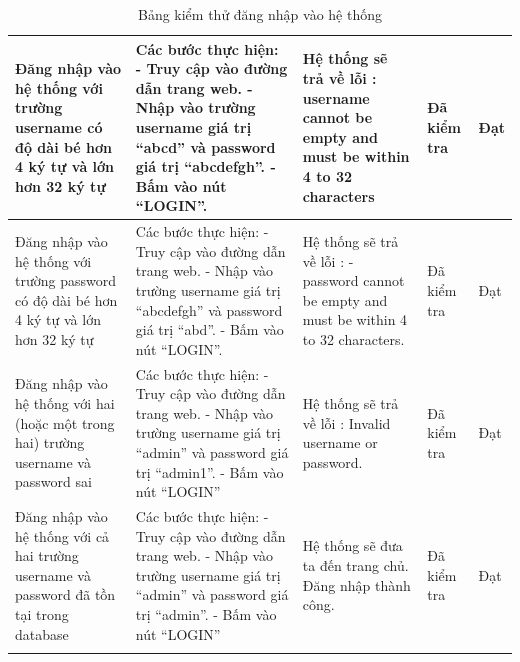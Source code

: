 \documentclass[a4paper]{article}
\begin{document}
\begin{longtable}{ | p{} |p{} | p{}  | p{}  | p{}  | }
\hline
Đăng nhập vào hệ thống với trường username có độ dài bé hơn 4 ký tự và lớn hơn 32 ký tự &
Các bước thực hiện: \newline
- Truy cập vào đường dẫn trang web.  \newline
- Nhập vào trường username giá trị “abcd” và password giá trị “abcdefgh”.  \newline
- Bấm vào nút “LOGIN”.
&
Hệ thống sẽ trả về lỗi : \newline
username cannot be empty and must be within 4 to 32 characters \newline
&
Đã kiểm tra &
Đạt \\


\hline
Đăng nhập vào hệ thống với trường password có độ dài bé hơn 4 ký tự và lớn hơn 32 ký tự &
Các bước thực hiện: \newline
- Truy cập vào đường dẫn trang web. \newline
- Nhập vào trường username giá trị “abcdefgh” và password giá trị “abd”. \newline
- Bấm vào nút “LOGIN”.
 &
Hệ thống sẽ trả về lỗi : \newline
- password cannot be empty and must be within 4 to 32 characters.
 &
Đã kiểm tra &
Đạt \\

\hline
Đăng nhập vào hệ thống với hai (hoặc một trong hai) trường username và password sai  &
Các bước thực hiện: \newline
- Truy cập vào đường dẫn trang web. \newline
- Nhập vào trường username giá trị “admin” và password giá trị “admin1”.  \newline
- Bấm vào nút “LOGIN”
&
Hệ thống sẽ trả về lỗi : Invalid username or password.
&
Đã kiểm tra &
Đạt \\

\hline
Đăng nhập vào hệ thống với cả hai trường username và password đã tồn tại trong database &
Các bước thực hiện: \newline
- Truy cập vào đường dẫn trang web. \newline
- Nhập vào trường username giá trị “admin” và password giá trị “admin”.  \newline
- Bấm vào nút “LOGIN”
&
Hệ thống sẽ đưa ta đến trang chủ. Đăng nhập thành công. &
Đã kiểm tra &
Đạt \\
\hline
\caption{Bảng kiểm thử đăng nhập vào hệ thống}
\end{longtable}
\end{document}
